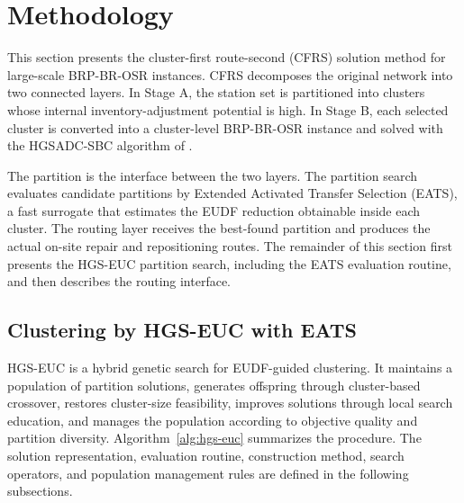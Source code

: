 \section{Methodology}\label{sec:methodology}\label{sec:framework}\label{sec:algorithm}\label{sec:cfrs-framework}

This section presents the cluster-first route-second (CFRS) solution method for
large-scale BRP-BR-OSR instances. CFRS decomposes the original network into two
connected layers. In Stage A, the station set is partitioned into clusters whose
internal inventory-adjustment potential is high. In Stage B, each selected
cluster is converted into a cluster-level BRP-BR-OSR instance and solved with the
HGSADC-SBC algorithm of \citet{huRepositioningBikeSharing2025}.

The partition is the interface between the two layers. The partition search
evaluates candidate partitions by Extended Activated Transfer Selection (EATS),
a fast surrogate that estimates the EUDF reduction obtainable inside each
cluster. The routing layer receives the best-found partition and produces the
actual on-site repair and repositioning routes. The remainder of this section
first presents the HGS-EUC partition search, including the EATS evaluation
routine, and then describes the routing interface.

\subsection{Clustering by HGS-EUC with EATS}\label{sec:hgs-euc}

HGS-EUC is a hybrid genetic search for EUDF-guided clustering. It maintains a
population of partition solutions, generates offspring through cluster-based
crossover, restores cluster-size feasibility, improves solutions through local
search education, and manages the population according to objective quality and
partition diversity. Algorithm~\ref{alg:hgs-euc} summarizes the procedure. The
solution representation, evaluation routine, construction method, search
operators, and population management rules are defined in the following
subsections.

